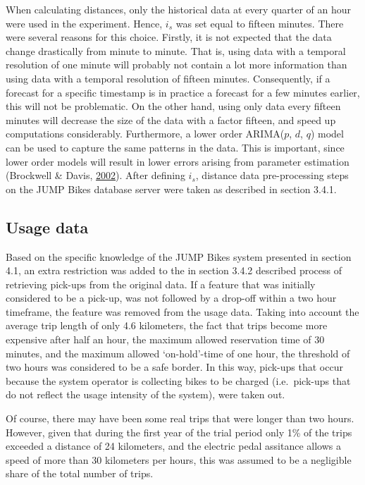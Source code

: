 \documentclass[12pt,oneside]{reedthesis}
\begin{document}
When calculating distances, only the historical data at every quarter of
an hour were used in the experiment. Hence, \(i_{s}\) was set equal to
fifteen minutes. There were several reasons for this choice. Firstly, it
is not expected that the data change drastically from minute to minute.
That is, using data with a temporal resolution of one minute will
probably not contain a lot more information than using data with a
temporal resolution of fifteen minutes. Consequently, if a forecast for
a specific timestamp is in practice a forecast for a few minutes
earlier, this will not be problematic. On the other hand, using only
data every fifteen minutes will decrease the size of the data with a
factor fifteen, and speed up computations considerably. Furthermore, a
lower order ARIMA(\(p\), \(d\), \(q\)) model can be used to capture the
same patterns in the data. This is important, since lower order models
will result in lower errors arising from parameter estimation (Brockwell
\& Davis, \protect\hyperlink{ref-brockwell2002}{2002}). After defining
\(i_{s}\), distance data pre-processing steps on the JUMP Bikes database
server were taken as described in section 3.4.1.

\subsection{Usage data}\label{usage-data-1}

Based on the specific knowledge of the JUMP Bikes system presented in
section 4.1, an extra restriction was added to the in section 3.4.2
described process of retrieving pick-ups from the original data. If a
feature that was initially considered to be a pick-up, was not followed
by a drop-off within a two hour timeframe, the feature was removed from
the usage data. Taking into account the average trip length of only 4.6
kilometers, the fact that trips become more expensive after half an
hour, the maximum allowed reservation time of 30 minutes, and the
maximum allowed `on-hold'-time of one hour, the threshold of two hours
was considered to be a safe border. In this way, pick-ups that occur
because the system operator is collecting bikes to be charged
(i.e.~pick-ups that do not reflect the usage intensity of the system),
were taken out.

Of course, there may have been some real trips that were longer than two
hours. However, given that during the first year of the trial period
only 1\% of the trips exceeded a distance of 24 kilometers, and the
electric pedal assitance allows a speed of more than 30 kilometers per
hours, this was assumed to be a negligible share of the total number of
trips.
\end{document}
